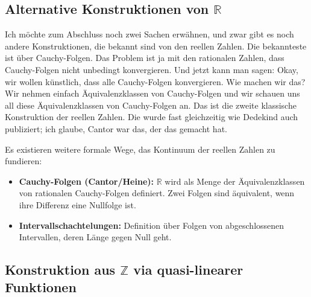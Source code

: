 \subsection{Alternative Konstruktionen von \texorpdfstring{$\mathbb{R}$}{R}}

\begin{spoken-clean}[01:21:00 - 01:21:10]
Ich möchte zum Abschluss noch zwei Sachen erwähnen, und zwar gibt es noch andere Konstruktionen, die bekannt sind von den reellen Zahlen. Die bekannteste ist über Cauchy-Folgen. Das Problem ist ja mit den rationalen Zahlen, dass Cauchy-Folgen nicht unbedingt konvergieren. Und jetzt kann man sagen: Okay, wir wollen künstlich, dass alle Cauchy-Folgen konvergieren. Wie machen wir das? Wir nehmen einfach Äquivalenzklassen von Cauchy-Folgen und wir schauen uns all diese Äquivalenzklassen von Cauchy-Folgen an. Das ist die zweite klassische Konstruktion der reellen Zahlen. Die wurde fast gleichzeitig wie Dedekind auch publiziert; ich glaube, Cantor war das, der das gemacht hat.
\end{spoken-clean}

\begin{math-stroke}
Es existieren weitere formale Wege, das Kontinuum der reellen Zahlen zu fundieren:
\begin{itemize}
    \item \textbf{Cauchy-Folgen (Cantor/Heine):} $\mathbb{R}$ wird als Menge der Äquivalenzklassen von rationalen Cauchy-Folgen definiert. Zwei Folgen sind äquivalent, wenn ihre Differenz eine Nullfolge ist.
    \item \textbf{Intervallschachtelungen:} Definition über Folgen von abgeschlossenen Intervallen, deren Länge gegen Null geht.
\end{itemize}
\end{math-stroke}

\subsection{Konstruktion aus \texorpdfstring{$\mathbb{Z}$}{Z} via quasi-linearer Funktionen}

